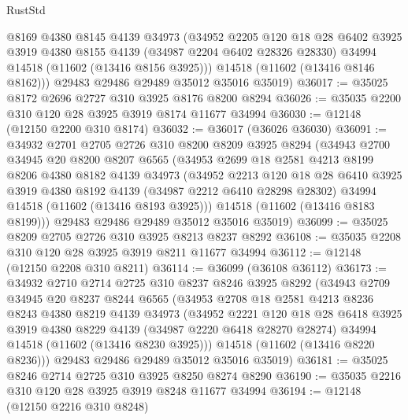\begin{lexlean}{RustStd}
\begin{coremodule}
        @8169
        @4380
        @8145
        @4139
        @34973
        (@34952
          @2205
          @120
          @18
          @28
          @6402
          @3925
          @3919
          @4380
          @8155
          @4139
          (@34987 @2204 @6402 @28326 @28330)
          @34994
          @14518
          (@11602 (@13416 @8156 @3925)))
        @14518
        (@11602 (@13416 @8146 @8162)))
      @29483
      @29486
      @29489
      @35012
      @35016
      @35019)
@36017 := @35025 @8172 @2696 @2727 @310 @3925 @8176 @8200 @8294
@36026 := @35035 @2200 @310 @120 @28 @3925 @3919 @8174 @11677 @34994
@36030 := @12148 (@12150 @2200 @310 @8174)
@36032 := @36017 (@36026 @36030)
@36091 := @34932
    @2701
    @2705
    @2726
    @310
    @8200
    @8209
    @3925
    @8294
    (@34943
      @2700
      @34945
      @20
      @8200
      @8207
      @6565
      (@34953
        @2699
        @18
        @2581
        @4213
        @8199
        @8206
        @4380
        @8182
        @4139
        @34973
        (@34952
          @2213
          @120
          @18
          @28
          @6410
          @3925
          @3919
          @4380
          @8192
          @4139
          (@34987 @2212 @6410 @28298 @28302)
          @34994
          @14518
          (@11602 (@13416 @8193 @3925)))
        @14518
        (@11602 (@13416 @8183 @8199)))
      @29483
      @29486
      @29489
      @35012
      @35016
      @35019)
@36099 := @35025 @8209 @2705 @2726 @310 @3925 @8213 @8237 @8292
@36108 := @35035 @2208 @310 @120 @28 @3925 @3919 @8211 @11677 @34994
@36112 := @12148 (@12150 @2208 @310 @8211)
@36114 := @36099 (@36108 @36112)
@36173 := @34932
    @2710
    @2714
    @2725
    @310
    @8237
    @8246
    @3925
    @8292
    (@34943
      @2709
      @34945
      @20
      @8237
      @8244
      @6565
      (@34953
        @2708
        @18
        @2581
        @4213
        @8236
        @8243
        @4380
        @8219
        @4139
        @34973
        (@34952
          @2221
          @120
          @18
          @28
          @6418
          @3925
          @3919
          @4380
          @8229
          @4139
          (@34987 @2220 @6418 @28270 @28274)
          @34994
          @14518
          (@11602 (@13416 @8230 @3925)))
        @14518
        (@11602 (@13416 @8220 @8236)))
      @29483
      @29486
      @29489
      @35012
      @35016
      @35019)
@36181 := @35025 @8246 @2714 @2725 @310 @3925 @8250 @8274 @8290
@36190 := @35035 @2216 @310 @120 @28 @3925 @3919 @8248 @11677 @34994
@36194 := @12148 (@12150 @2216 @310 @8248)

\end{coremodule}
\end{lexlean}
